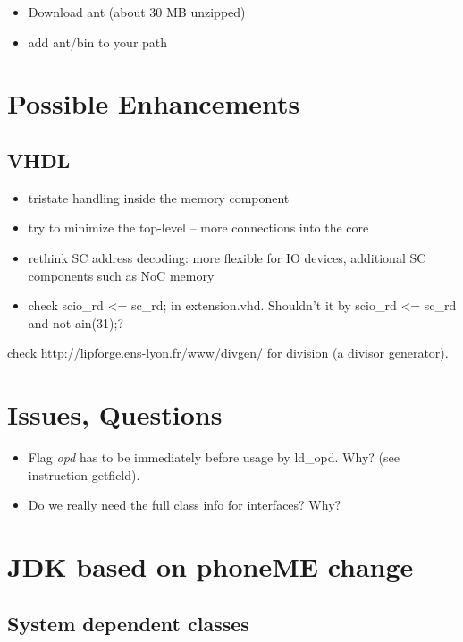 \documentclass[a4paper,12pt]{scrartcl}
\newcommand{\code}[1]{{\textsf{#1}}}
\begin{document}
\begin{itemize}
    \item Download ant (about 30 MB unzipped)
    \item add ant/bin to your path
\end{itemize}

\section{Possible Enhancements}

\subsection{VHDL}

\begin{itemize}
    \item tristate handling inside the memory component
    \item try to minimize the top-level -- more connections into the
    core
    \item rethink SC address decoding: more flexible for IO devices,
    additional SC components such as NoC memory
    \item check \code{scio\_rd <= sc\_rd;} in \code{extension.vhd}.
    Shouldn't it by \code{scio\_rd <= sc\_rd and not ain(31);}?
\end{itemize}

check \url{http://lipforge.ens-lyon.fr/www/divgen/} for division (a
divisor generator).

\section{Issues, Questions}

\begin{itemize}
    \item Flag \emph{opd} has to be immediately before usage by ld\_opd.
    Why? (see instruction getfield).
    \item Do we really need the full class info for interfaces? Why?
\end{itemize}

\section{JDK based on phoneME change}

\subsection{System dependent classes}
\end{document}
